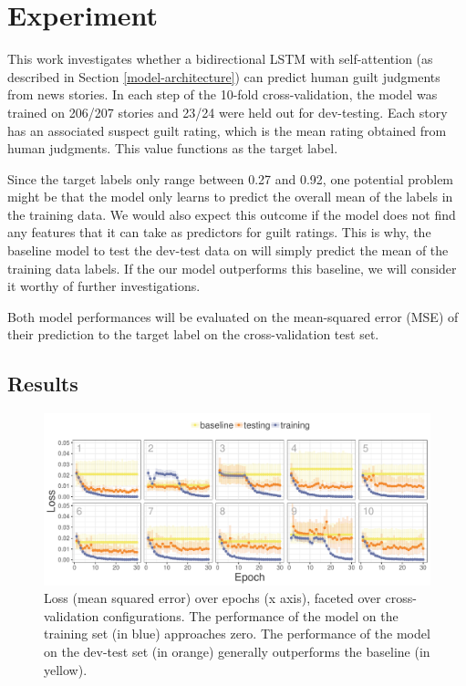 \documentclass[11pt,a4paper]{article}
\begin{document}
\section{Experiment}

This work investigates whether a bidirectional LSTM with self-attention (as described in Section \ref{model-architecture}) can predict human guilt judgments from news stories. In each step of the 10-fold cross-validation, the model was trained on 206/207 stories and 23/24 were held out for dev-testing. Each story has an associated suspect guilt rating, which is the mean rating obtained from human judgments. This value functions as the target label.

Since the target labels only range between 0.27 and 0.92, one potential problem might be that the model only learns to predict the overall mean of the labels in the training data. We would also expect this outcome if the model does not find any features that it can take as predictors for guilt ratings. This is why, the baseline model to test the dev-test data on will simply predict the mean of the training data labels. If the our model outperforms this baseline, we will consider it worthy of further investigations.

Both model performances will be evaluated on the mean-squared error (MSE) of their prediction to the target label on the cross-validation test set.

\subsection{Results}

\begin{figure}
	\includegraphics[width=\linewidth]{graphs/lossPlotCropped.pdf}
	\caption{Loss (mean squared error) over epochs (x axis), faceted over cross-validation configurations. The performance of the model on the training set (in blue) approaches zero. The performance of the model on the dev-test set (in orange) generally outperforms the baseline (in yellow).}
	\label{fig:loss}
\end{figure}
\end{document}
